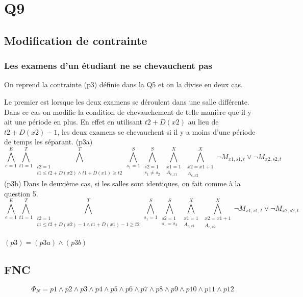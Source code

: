 \documentclass[a4paper,11pt]{article}
\begin{document}
\section{Q9}

\subsection{Modification de contrainte}
\subsubsection{Les examens d'un étudiant ne se chevauchent pas}
On reprend la contrainte (p3) définie dans la Q5 et on la divise en deux cas. 

Le premier est lorsque les deux examens se déroulent dans une salle différente. Dans ce cas on modifie la condition de chevauchement de telle manière que il y ait une période en plus. En effet en utilisant $ t2 + D(x2) $ au lieu de $ t2 + D(x2) - 1 $, les deux examens se chevauchent si il y a moins d'une période de temps les séparant.
(p3a)
\begin{displaymath}
\bigwedge\limits_{e=1}^{E}\bigwedge\limits_{t1=1}^{T}\bigwedge\limits_{\substack{t2=1 \\ t1 \leq t2 + D(x2) \wedge t1 + D(x1) \geq t2}}^{T}\bigwedge\limits_{s_{1}=1}^{S}\bigwedge\limits_{\substack{s2=1 \\ s_{1} \neq s_{2}}}^{S}\bigwedge\limits_{\substack{x1=1 \\ A_{e,x1}}}^{X}\bigwedge\limits_{\substack{x2=x1+1 \\ A_{e,x2}}}^{X} \neg M_{x1, s1, t} \vee \neg M_{x2, s2, t}
\end{displaymath}
(p3b)
Dans le deuxième cas, si les salles sont identiques, on fait comme à la question 5.
\begin{displaymath}
\bigwedge\limits_{e=1}^{E}\bigwedge\limits_{t1=1}^{T}\bigwedge\limits_{\substack{t2=1 \\ t1 \leq t2 + D(x2)-1 \wedge t1 + D(x1)-1 \geq t2}}^{T}\bigwedge\limits_{s_{1}=1}^{S}\bigwedge\limits_{\substack{s2=1 \\ s_{1} = s_{2}}}^{S}\bigwedge\limits_{\substack{x1=1 \\ A_{e,x1}}}^{X}\bigwedge\limits_{\substack{x2=x1+1 \\ A_{e,x2}}}^{X} \neg M_{x1, s1, t} \vee \neg M_{x2, s2, t}
\end{displaymath}

$ (p3) = (p3a) \wedge (p3b) $
\subsection{FNC}
\begin{displaymath}
	\Phi_{N} = p1 \wedge p2 \wedge p3 \wedge p4 \wedge p5 \wedge p6 \wedge p7 \wedge p8 \wedge p9 \wedge p10 \wedge p11 \wedge p12
\end{displaymath}
\end{document}
